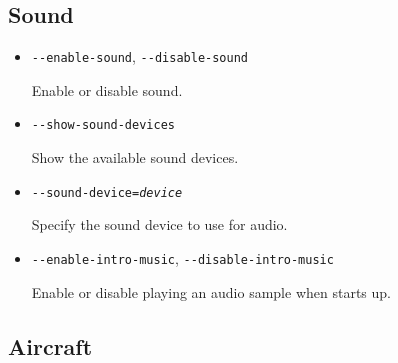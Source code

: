 \subsection{Sound}
\begin{itemize}
\item{\texttt{-$ $-enable-sound}, \texttt{-$ $-disable-sound}}

  Enable or disable sound.

\item{\texttt{-$ $-show-sound-devices}}

  Show the available sound devices.

\item{\texttt{-$ $-sound-device={\it device}}}

  Specify the sound device to use for audio.

\item{\texttt{-$ $-enable-intro-music}, \texttt{-$ $-disable-intro-music}}

  Enable or disable playing an audio sample when \FlightGear{} starts up.

\end{itemize}

\subsection{Aircraft}


